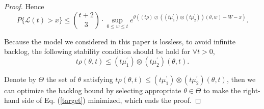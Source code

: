 \documentclass[12pt]{article}
\newtheorem{proof}{Proof}
\def \QED {\hfill \vrule height6pt width 6pt depth 0pt}
\begin{document}
\begin{proof}
Hence
\begin{equation}\label{target}
P\{\mathcal{L}(t)>x\}\leq {t+2\choose 3}\cdot \sup_{0\leq w\leq t}e^{\theta((t\rho)\oslash((t\mu_1^\prime)\otimes(t\mu_2^\prime))(\theta,w)-W-x)}.
\end{equation}

Because the model we considered in this paper is lossless, to avoid infinite backlog, the following stability condition should be hold for $\forall t>0$,
$$t\rho(\theta,t)\leq (t\mu_1^\prime)\otimes(t\mu_2^\prime)(\theta,t).$$

Denote by $\Theta$ the set of $\theta$ satisfying $t\rho(\theta,t)\leq (t\mu_1^\prime)\otimes(t\mu_2^\prime)(\theta,t)$, then we can optimize the backlog bound by selecting appropriate $\theta\in\Theta$ to make the right-hand side of Eq. (\ref{target}) minimized, which ends the proof.\QED
\end{proof}
\end{document}
